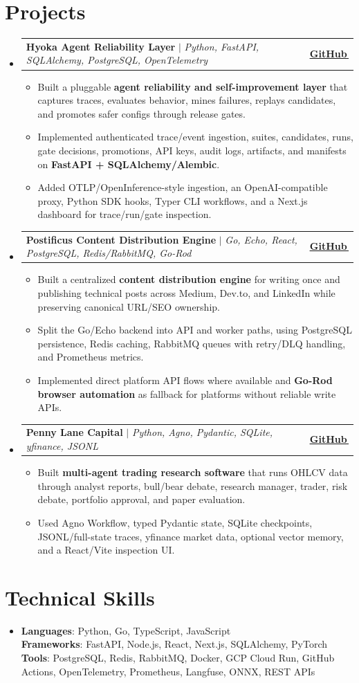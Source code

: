 \documentclass[letterpaper,11pt]{article}
\makeatletter
\newcommand{\bodyhref}[2]{\href{#1}{\underline{#2}\,\faExternalLink*}}
\newcommand{\resumeItem}[1]{\item{\fontsize{8.82pt}{9.28pt}\selectfont #1\vspace{-0.7pt}}}
\newcommand{\resumeProjectHeading}[2]{
    \item
    \begin{tabular*}{1.0\textwidth}{l@{\extracolsep{\fill}}r}
      \small#1 & \textbf{\small #2}\\
    \end{tabular*}\vspace{-4pt}
}
\newcommand{\resumeSubHeadingListStart}{\begin{itemize}[leftmargin=0.0in, label={}, itemsep=0.6pt, topsep=0pt, parsep=0pt, partopsep=0pt]}
\newcommand{\resumeSubHeadingListEnd}{\end{itemize}}
\newcommand{\resumeItemListStart}{\begin{itemize}[leftmargin=0.16in,itemsep=0.3pt,topsep=0.9pt,parsep=0pt,partopsep=0pt]}
\newcommand{\resumeItemListEnd}{\end{itemize}\vspace{-3pt}}
\makeatother
\begin{document}
\section{Projects}
\resumeSubHeadingListStart
\resumeProjectHeading
{\textbf{Hyoka Agent Reliability Layer} $|$ \emph{Python, FastAPI, SQLAlchemy, PostgreSQL, OpenTelemetry}}{\bodyhref{https://github.com/unichronic/hyoka}{GitHub}}
\resumeItemListStart
\resumeItem{Built a pluggable \textbf{agent reliability and self-improvement layer} that captures traces, evaluates behavior, mines failures, replays candidates, and promotes safer configs through release gates.}
\resumeItem{Implemented authenticated trace/event ingestion, suites, candidates, runs, gate decisions, promotions, API keys, audit logs, artifacts, and manifests on \textbf{FastAPI + SQLAlchemy/Alembic}.}
\resumeItem{Added OTLP/OpenInference-style ingestion, an OpenAI-compatible proxy, Python SDK hooks, Typer CLI workflows, and a Next.js dashboard for trace/run/gate inspection.}
\resumeItemListEnd
\resumeProjectHeading
{\textbf{Postificus Content Distribution Engine} $|$ \emph{Go, Echo, React, PostgreSQL, Redis/RabbitMQ, Go-Rod}}{\bodyhref{https://github.com/unichronic/postificus}{GitHub}}
\resumeItemListStart
\resumeItem{Built a centralized \textbf{content distribution engine} for writing once and publishing technical posts across Medium, Dev.to, and LinkedIn while preserving canonical URL/SEO ownership.}
\resumeItem{Split the Go/Echo backend into API and worker paths, using PostgreSQL persistence, Redis caching, RabbitMQ queues with retry/DLQ handling, and Prometheus metrics.}
\resumeItem{Implemented direct platform API flows where available and \textbf{Go-Rod browser automation} as fallback for platforms without reliable write APIs.}
\resumeItemListEnd
\resumeProjectHeading
{\textbf{Penny Lane Capital} $|$ \emph{Python, Agno, Pydantic, SQLite, yfinance, JSONL}}{\bodyhref{https://github.com/unichronic/pennylane}{GitHub}}
\resumeItemListStart
\resumeItem{Built \textbf{multi-agent trading research software} that runs OHLCV data through analyst reports, bull/bear debate, research manager, trader, risk debate, portfolio approval, and paper evaluation.}
\resumeItem{Used Agno Workflow, typed Pydantic state, SQLite checkpoints, JSONL/full-state traces, yfinance market data, optional vector memory, and a React/Vite inspection UI.}
\resumeItemListEnd
\resumeSubHeadingListEnd

\section{Technical Skills}
\begin{itemize}[leftmargin=0.15in, label={}, topsep=0pt, itemsep=0pt, parsep=0pt, partopsep=0pt]
  \item{\fontsize{9.0pt}{9.25pt}\selectfont
   \textbf{Languages}{: Python, Go, TypeScript, JavaScript} \\
   \textbf{Frameworks}{: FastAPI, Node.js, React, Next.js, SQLAlchemy, PyTorch} \\
   \textbf{Tools}{: PostgreSQL, Redis, RabbitMQ, Docker, GCP Cloud Run, GitHub Actions, OpenTelemetry, Prometheus, Langfuse, ONNX, REST APIs} \\
  }
\end{itemize}
\end{document}
